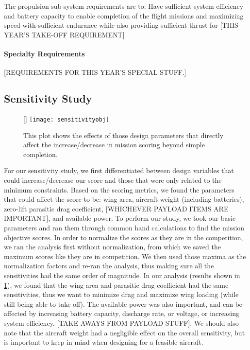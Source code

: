 \documentclass[report]{byu-aero}
\begin{document}
The propulsion sub-system requirements are to: Have sufficient system efficiency and battery capacity to enable completion of the flight missions and maximizing speed with sufficient endurance while also providing sufficient thrust for {\color{BYUred}[THIS YEAR'S TAKE-OFF REQUIREMENT]}

\paragraph{Specialty Requirements} %
\label{sssec:SpecialReqs}

{\color{BYUred}[REQUIREMENTS FOR THIS YEAR'S SPECIAL STUFF.]} 
\lipsum[2]




\subsection{Sensitivity Study}
\label{ssec:SensitivityStudy}

\begin{figure}[h!]
	\centering
	\raisebox{0pt}[\dimexpr{}\baselineskip\relax]{
		\texttt{[image: sensitivityobj]}
	}
	\caption{This plot shows the effects of those design parameters that directly affect the increase/decrease in mission scoring beyond simple completion.}
	\label{fig:sensitivity}
\end{figure}

For our sensitivity study, we first differentiated between design variables that could increase/decrease our score and those that were only related to the minimum constraints. Based on the scoring metrics, we found the parameters that could affect the score to be: wing area, aircraft weight (including batteries), zero-lift parasitic drag coefficient, {\color{BYUred}[WHICHEVER PAYLOAD ITEMS ARE IMPORTANT]}, and available power.  To perform our study, we took our basic parameters and ran them through common hand calculations to find the mission objective scores. In order to normalize the scores as they are in the competition, we ran the analysis first without normalization, from which we saved the maximum scores like they are in competition. We then used those maxima as the normalization factors and re-ran the analysis, thus making sure all the sensitivities had the same order of magnitude.  In our analysis (results shown in \cref{fig:sensitivity}), we found that the wing area and parasitic drag coefficient had the same sensitivities, thus we want to minimize drag and maximize wing loading (while still being able to take off).  The available power was also important, and can be affected by increasing battery capacity, discharge rate, or voltage, or increasing system efficiency. {\color{BYUred}[TAKE AWAYS FROM PAYLOAD STUFF]}. We should also note that the aircraft weight had a negligible effect on the overall sensitivity, but is important to keep in mind when designing for a feasible aircraft.
\end{document}
